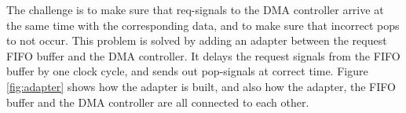 \begin{appendix}

The challenge is to make sure that req-signals to the DMA controller arrive at the same time with the corresponding data, and to make sure that incorrect pops to not occur.
This problem is solved by adding an adapter between the request FIFO buffer and the DMA controller.
It delays the request signals from the FIFO buffer by one clock cycle, and sends out pop-signals at correct time.
Figure \ref{fig:adapter} shows how the adapter is built, and also how the adapter, the FIFO buffer and the DMA controller are all connected to each other.


\end{appendix}
